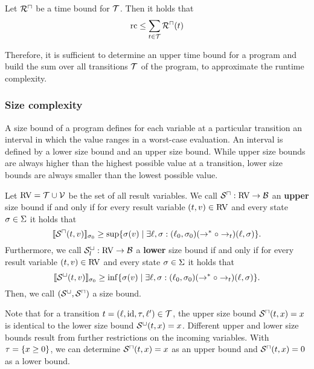 \begin{theorem}
	Let ${\mathcal{R}^\sqcap}$ be a time bound for $\mathcal{T}$.
	Then it holds that 
	\[ \text{rc} \leq \sum_{t \in \mathcal{T}}{\mathcal{R}^\sqcap}(t) \]
\end{theorem}

Therefore, it is sufficient to determine an upper time bound for a program and build the sum over all transitions $\mathcal{T}$ of the program, to approximate the runtime complexity. 

\subsubsection{Size complexity}

A size bound of a program defines for each variable at a particular transition an interval in which the value ranges in a worst-case evaluation.
An interval is defined by a lower size bound and an upper size bound.
While upper size bounds are always higher than the highest possible value at a transition, lower size bounds are always smaller than the lowest possible value.

\begin{definition}
  Let $\text{RV} = \mathcal{T} \cup \mathcal{V}$ be the set of all result variables.
  We call ${\mathcal{S}^\sqcap}: \text{RV} \rightarrow \mathcal{B}$ an \textbf{upper} size bound if and only if for every result variable $(t, v) \in \text{RV}$ and every state $\sigma \in \Sigma$ it holds that
  \[ \llbracket {\mathcal{S}^\sqcap}(t, v) \rrbracket_{\sigma_0} \geq \sup \lbrace \sigma(v) \mid \exists \ell, \sigma: (\ell_0, \sigma_0) (\rightarrow^* \circ \rightarrow_t) (\ell, \sigma) \rbrace. \]
  Furthermore, we call ${\mathcal{S}^\sqcup_l}: \text{RV} \rightarrow \mathcal{B}$ a \textbf{lower} size bound if and only if for every result variable $(t, v) \in \text{RV}$ and every state $\sigma \in \Sigma$ it holds that
  \[ \llbracket {\mathcal{S}^\sqcup}(t, v) \rrbracket_{\sigma_0} \geq \inf \lbrace \sigma(v) \mid \exists \ell, \sigma: (\ell_0, \sigma_0) (\rightarrow^* \circ \rightarrow_t) (\ell, \sigma) \rbrace. \]
  Then, we call ${({\mathcal{S}^\sqcup}, {\mathcal{S}^\sqcap})}$ a size bound.
\end{definition}

Note that for a transition $t = (\ell,\text{id},\tau,\ell') \in \mathcal{T}$, the upper size bound ${\mathcal{S}^\sqcap}(t,x) = x$ is identical to the lower size bound ${\mathcal{S}^\sqcup}(t,x) = x$.
Different upper and lower size bounds result from further restrictions on the incoming variables.
With $\tau = \lbrace x \geq 0 \rbrace$, we can determine ${\mathcal{S}^\sqcap}(t,x) = x$ as an upper bound and ${\mathcal{S}^\sqcap}(t,x) = 0$ as a lower bound.

